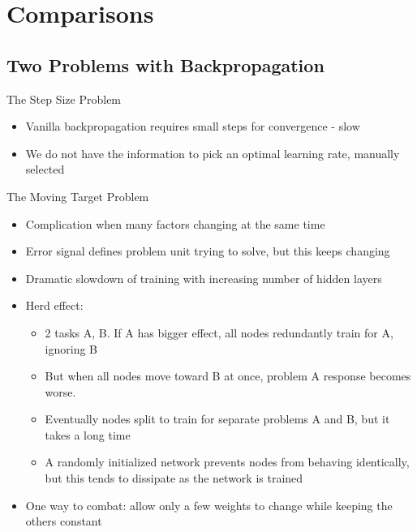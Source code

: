 \documentclass[presentation]{beamer}
\begin{document}
\section{Comparisons}
\label{sec:org8f2bd35}
\subsection{Two Problems with Backpropagation}
\label{sec:org168fc30}
\begin{frame}[label={sec:org200ccae}]{The Step Size Problem}
\begin{itemize}
\item Vanilla backpropagation requires small steps for convergence - slow
\item We do not have the information to pick an optimal learning rate, manually selected
\end{itemize}
\end{frame}
\begin{frame}[label={sec:orgde08e3c}]{The Moving Target Problem}
\begin{itemize}
\item Complication when many factors changing at the same time
\item Error signal defines problem unit trying to solve, but this keeps changing
\item Dramatic slowdown of training with increasing number of hidden layers
\item Herd effect:
\begin{itemize}
\item 2 tasks A, B. If A has bigger effect, all nodes redundantly train for A, ignoring B
\item But when all nodes move toward B at once, problem A response becomes worse.
\item Eventually nodes split to train for separate problems A and B, but it takes a long time
\item A randomly initialized network prevents nodes from behaving identically, but this tends to dissipate as the network is trained
\end{itemize}
\item One way to combat: allow only a few weights to change while keeping the others constant
\end{itemize}
\end{frame}
\end{document}
